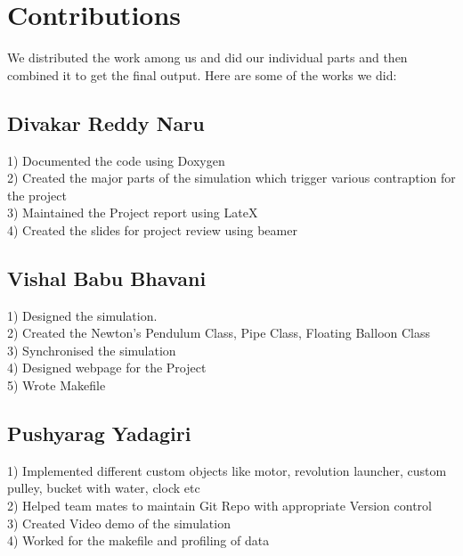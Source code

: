 \chapter{Contributions}


We distributed the work among us and did our individual parts and then combined it to get the final output. 
 Here are some of the works we did:
 \section{Divakar Reddy Naru}
 1) Documented the code using Doxygen \\
2) Created the major parts of the simulation which trigger various contraption for the project \\
3) Maintained the Project report using LateX \\
4) Created the slides for project review using beamer 
 \section{ Vishal Babu Bhavani} 
1) Designed the simulation. \\
2) Created the Newton's Pendulum Class, Pipe Class, Floating Balloon Class \\
3) Synchronised the simulation \\
4) Designed webpage for the Project \\
5) Wrote Makefile 
 \section{Pushyarag Yadagiri} 
1) Implemented different custom objects like motor, revolution launcher, custom pulley, bucket with water, clock etc \\
2) Helped team mates to maintain Git Repo with appropriate Version control \\
3) Created Video demo of the simulation \\
4) Worked for the makefile and profiling of data \\
